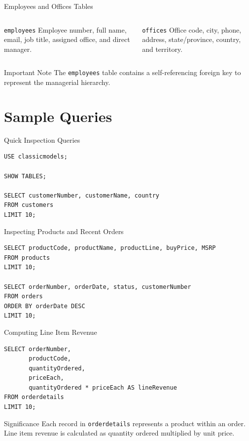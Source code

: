 \documentclass[aspectratio=169,professionalfonts]{beamer}
\newcommand{\code}[1]{\texttt{#1}}
\begin{document}
\begin{frame}{Employees and Offices Tables}
\begin{columns}[T,onlytextwidth]
\begin{block}{\code{employees}}
Employee number, full name, email, job title, assigned office, and direct manager.
\end{block}
\begin{block}{\code{offices}}
Office code, city, phone, address, state/province, country, and territory.
\end{block}
\end{columns}
\vspace{0.5em}
\begin{alertblock}{Important Note}
The \code{employees} table contains a self-referencing foreign key to represent the managerial hierarchy.
\end{alertblock}
\end{frame}

\section{Sample Queries}

\begin{frame}[fragile]{Quick Inspection Queries}
\begin{lstlisting}[style=sqlstyle]
USE classicmodels;

SHOW TABLES;

SELECT customerNumber, customerName, country
FROM customers
LIMIT 10;
\end{lstlisting}
\end{frame}

\begin{frame}[fragile]{Inspecting Products and Recent Orders}
\begin{lstlisting}[style=sqlstyle]
SELECT productCode, productName, productLine, buyPrice, MSRP
FROM products
LIMIT 10;

SELECT orderNumber, orderDate, status, customerNumber
FROM orders
ORDER BY orderDate DESC
LIMIT 10;
\end{lstlisting}
\end{frame}

\begin{frame}[fragile]{Computing Line Item Revenue}
\begin{lstlisting}[style=sqlstyle]
SELECT orderNumber,
       productCode,
       quantityOrdered,
       priceEach,
       quantityOrdered * priceEach AS lineRevenue
FROM orderdetails
LIMIT 10;
\end{lstlisting}
\begin{block}{Significance}
Each record in \code{orderdetails} represents a product within an order. Line item revenue is calculated as quantity ordered multiplied by unit price.
\end{block}
\end{frame}
\end{document}
